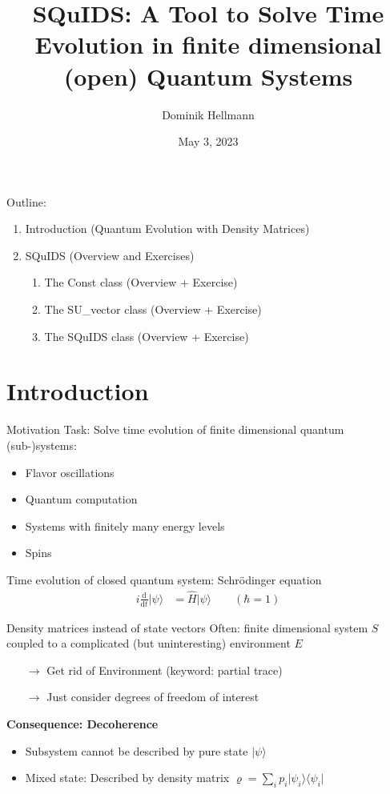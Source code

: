 \documentclass[]{beamer}
\title{\Large SQuIDS: A Tool to Solve Time Evolution in finite dimensional (open) Quantum Systems\\\vspace*{0.5cm}{\small An Application to Neutrino Oscillations\\\href{https://arxiv.org/abs/1412.3832.pdf}{arxiv:1412.3832}}}
\author{Dominik Hellmann}
\institute[TU Dortmund]{\scriptsize TU Dortmund\\WG Päs
}
\date{May 3, 2023}
\begin{document}
\nocite{*}


\frame{\titlepage}

\begin{frame}
  Outline:
  \begin{enumerate}
    \item Introduction (Quantum Evolution with Density Matrices)
    \item SQuIDS (Overview and Exercises)
    \begin{enumerate}
      \item The Const class (Overview + Exercise)
      \item The SU\_vector class (Overview + Exercise)
      \item The SQuIDS class (Overview + Exercise)
    \end{enumerate}
  \end{enumerate}
\end{frame}

\section{Introduction}

\begin{frame}{Motivation}
  Task: Solve time evolution of finite dimensional quantum (sub-)systems:
  \begin{itemize}
    \item Flavor oscillations
    \item Quantum computation
    \item Systems with finitely many energy levels
    \item Spins
  \end{itemize}
  Time evolution of closed quantum system: Schrödinger equation
  \begin{align}
    i \frac{\mathrm{d}}{\mathrm{d} t} \vert \psi \rangle &= \hat{H} \vert \psi \rangle \qquad (\hbar = 1)
  \end{align} 
\end{frame}

\begin{frame}{Density matrices instead of state vectors}
  Often: finite dimensional system \(S\) coupled to a complicated (but uninteresting) environment \(E\)
  \begin{itemize}
    \item[\(\rightarrow\)] Get rid of Environment (keyword: partial trace)
    \item[\(\rightarrow\)] Just consider degrees of freedom of interest
  \end{itemize}
  \textbf{Consequence: Decoherence}
  \begin{itemize}
    \item Subsystem cannot be described by pure state \(\vert \psi \rangle\)
    \item Mixed state: Described by density matrix \(\varrho = \sum_{i} p_i \vert \psi_i \rangle \langle \psi_i \vert\)
  \end{itemize}
\end{frame}
\end{document}
